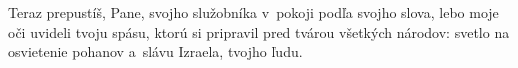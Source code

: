 Teraz prepustíš, Pane, svojho služobníka
v~pokoji podľa svojho slova,
\versseparator
lebo moje oči uvideli tvoju spásu,
\versseparator
ktorú si pripravil pred tvárou všetkých národov:
\versseparator
svetlo na osvietenie pohanov
a~slávu Izraela, tvojho ľudu.